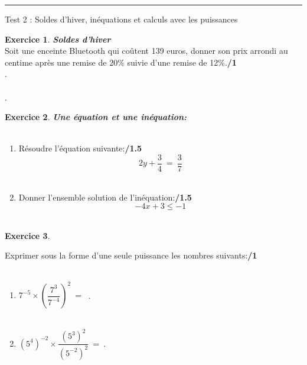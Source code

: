 \documentclass[a4paper,10pt]{article}
\theoremstyle{definition}
\newtheorem{exo}{Exercice}
\begin{document}
	
	\rule[0.5ex]{\textwidth}{0.1mm}	
	
	\begin{center}
		\large \sc Test 2 : Soldes d'hiver, inéquations et calculs avec les puissances
	\end{center}

\begin{exo}	\textit{\textbf{Soldes d'hiver}}\\[0.25cm]
Soit une enceinte Bluetooth qui coûtent 139 euros, donner son prix arrondi au centime après une remise de 20\% suivie d'une remise de 12\%.\hfill\textbf{/1}\\[0.5cm]
.\dotfill \\\\
.\dotfill \\

\end{exo}

\begin{exo} \textit{\textbf{Une équation et une inéquation:}}\\\\
\begin{enumerate}
	\item Résoudre l'équation suivante:\hfill\textbf{/1.5}
	$$2y+\dfrac{3}{4} \ = \  \dfrac{3}{7}$$\hfill\\[4cm]
	\item 	Donner l'ensemble solution de l'inéquation:\hfill\textbf{/1.5}
	$$-4x+3 \leq -1$$ \hfill\\[4cm]
\end{enumerate}

\end{exo}

\begin{exo} \textit{\textbf{}}\\
	\item Exprimer sous la forme d'une seule puissance les nombres suivants:\hfill\textbf{/1}\\\\
	\begin{enumerate}[$\square$]
		\item $ 7^{-5}\times \left(\dfrac{7^3}{7^{-4}}\right)^2 \ = \  $ .\dotfill \\\\
		
		\item $ (5^4)^{-2}\times \dfrac{(5^{3})^2}{(5^{-2})^2}  \ = \ $.\dotfill \\\\
		
	\end{enumerate}



\end{exo}
\end{document}
